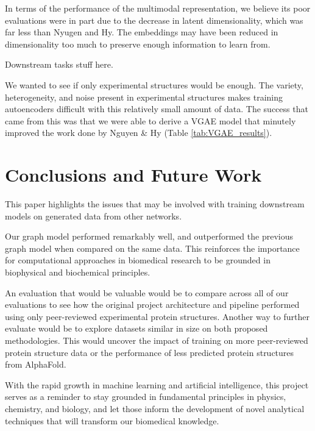 \documentclass{article}
\begin{document}
In terms of the performance of the multimodal representation, we believe its poor evaluations were in part due to the decrease in latent dimensionality, which was far less than Nyugen and Hy. The embeddings may have been reduced in dimensionality too much to preserve enough information to learn from.

Downstream tasks stuff here.

We wanted to see if only experimental structures would be enough. The variety, heterogeneity, and noise present in experimental structures makes training autoencoders difficult with this relatively small amount of data. The success that came from this was that we were able to derive a VGAE model that minutely improved the work done by Nguyen \& Hy (Table \ref{tab:VGAE_results}).

\section{Conclusions and Future Work}
This paper highlights the issues that may be involved with training downstream models on generated data from other networks.

Our graph model performed remarkably well, and outperformed the previous graph model when compared on the same data. This reinforces the importance for computational approaches in biomedical research to be grounded in biophysical and biochemical principles. 

An evaluation that would be valuable would be to compare across all of our evaluations to see how the original project architecture and pipeline performed using only peer-reviewed experimental protein structures. Another way to further evaluate would be to explore datasets similar in size on both proposed methodologies. This would uncover the impact of training on more peer-reviewed protein structure data or the performance of less predicted protein structures from AlphaFold. 

With the rapid growth in machine learning and artificial intelligence, this project serves as a reminder to stay grounded in fundamental principles in physics, chemistry, and biology, and let those inform the development of novel analytical techniques that will transform our biomedical knowledge.



\end{document}
